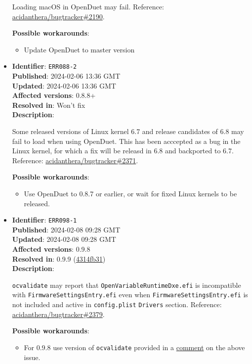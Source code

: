 \documentclass[]{article}
\providecommand{\tightlist}{%
  \setlength{\itemsep}{0pt}\setlength{\parskip}{0pt}}
\begin{document}
\begin{itemize}
  Loading macOS in OpenDuet may fail. Reference:
  \href{https://github.com/acidanthera/bugtracker/issues/2190}{acidanthera/bugtracker\#2190}.

  \textbf{Possible workarounds}:
  \begin{itemize}
    \tightlist

    \item Update OpenDuet to master version

  \end{itemize}

\item
  \textbf{Identifier}: \texttt{ERR088-2} \\
  \textbf{Published}: 2024-02-06 13:36 GMT \\
  \textbf{Updated}: 2024-02-06 13:36 GMT \\
  \textbf{Affected versions}: 0.8.8+ \\
  \textbf{Resolved in}: Won't fix \\
  \textbf{Description}:

  Some released versions of Linux kernel 6.7 and release candidates of 6.8 may
  fail to load when using OpenDuet. This has been acccepted as a bug in the
  Linux kernel, for which a fix will be releasd in 6.8 and backported to 6.7.
  Reference:
  \href{https://github.com/acidanthera/bugtracker/issues/2371#issuecomment-1929638701}{acidanthera/bugtracker\#2371}.

  \textbf{Possible workarounds}:
  \begin{itemize}
    \tightlist

    \item Use OpenDuet to 0.8.7 or earlier, or wait for fixed Linux kernels to
    be released.

  \end{itemize}

\item
  \textbf{Identifier}: \texttt{ERR098-1} \\
  \textbf{Published}: 2024-02-08 09:28 GMT \\
  \textbf{Updated}: 2024-02-08 09:28 GMT \\
  \textbf{Affected versions}: 0.9.8 \\
  \textbf{Resolved in}: 0.9.9 (\href{https://github.com/acidanthera/OpenCorePkg/commit/4314fb31ecb974c30f99ac17db1f2b67ce1bb765}{4314fb31}) \\
  \textbf{Description}:

  \texttt{ocvalidate} may report that \texttt{OpenVariableRuntimeDxe.efi} is
  incompatible with \texttt{FirmwareSettingsEntry.efi} even when
  \texttt{FirmwareSettingsEntry.efi} is not included and active in \texttt{config.plist}
  \texttt{Drivers} section. Reference:
  \href{https://github.com/acidanthera/bugtracker/issues/2379}{acidanthera/bugtracker\#2379}.

  \textbf{Possible workarounds}:
  \begin{itemize}
    \tightlist

    \item For 0.9.8 use version of \texttt{ocvalidate} provided in a
    \href{https://github.com/acidanthera/bugtracker/issues/2379#issuecomment-1933674398}{comment}
    on the above issue.

  \end{itemize}

\end{itemize}
\end{document}
